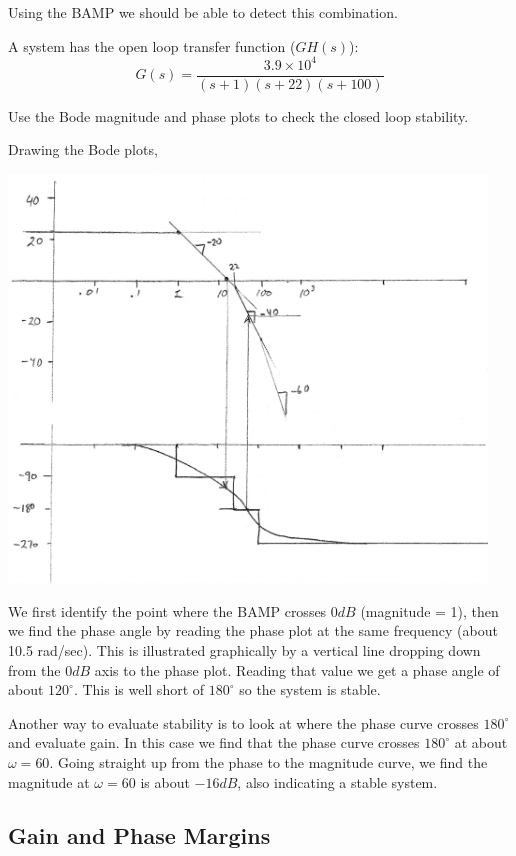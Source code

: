Using the BAMP we should be able to detect this combination.

\begin{ExampleSmall}\label{bodestabilityexample}
A system has the open loop transfer function ($GH(s)$):
\[
G(s) = \frac {3.9\times 10^4} {(s+1)(s+22)(s+100)}
\]

Use the Bode magnitude and phase plots to check the closed loop stability.

Drawing the Bode plots,

\includegraphics[width=5.0in]{figs06/00794aa.png}

We first identify the point where the BAMP crosses 0$dB$ (magnitude = 1), then we find the phase angle by reading the phase plot at the same frequency (about 10.5 rad/sec).   This is illustrated graphically by a vertical line dropping down from the $0dB$ axis to the phase plot.  Reading that value we get a phase angle of about $120^\circ$.  This is well short of $180^\circ$ so the system is stable.

Another way to evaluate stability is to look at where the phase curve crosses $180^\circ$ and evaluate gain.  In this case we find that the phase curve crosses $180^\circ$ at about $\omega=60$.  Going straight up from the phase to the magnitude curve, we find the magnitude at $\omega = 60$ is about $-16dB$, also indicating a stable system.
\end{ExampleSmall}

\subsection{Gain and Phase Margins}\label{GainPhaseMargins}

